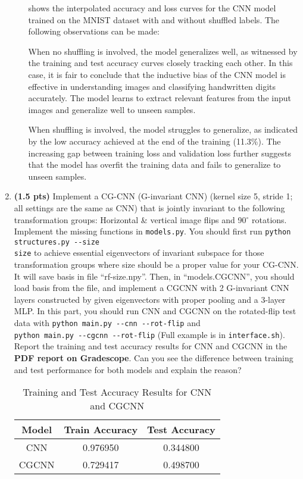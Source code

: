 \begin{enumerate}
\begin{enumerate}
 shows the interpolated accuracy and loss
curves for the CNN model trained on the MNIST dataset with and without shuffled
labels. The following observations can be made:

When no shuffling is involved, the model generalizes well, as witnessed by the
training and test accuracy curves closely tracking each other. In this case, it
is fair to conclude that the inductive bias of the CNN model is effective in
understanding images and classifying handwritten digits accurately. The model
learns to extract relevant features from the input images and generalize well to
unseen samples.

When shuffling is involved, the model struggles to generalize, as indicated by
the low accuracy achieved at the end of the training (11.3\%). The increasing
gap between training loss and validation loss further suggests that the model
has overfit the training data and fails to generalize to unseen samples. 


\end{enumerate}

\item {\bf (1.5 pts)}
 Implement a CG-CNN (G-invariant CNN) (kernel size 5, stride 1; all settings are the same as CNN) that is jointly invariant to the following transformation groups: Horizontal \& vertical image flips and 90$^\circ$ rotations. Implement the missing functions in \texttt{models.py}.
 You should first run \verb|python structures.py --size|\\
 \verb|size| to achieve essential
 eigenvectors of invariant subspace for those transformation groups where size should be a proper value for your CG-CNN.
 It will save basis in file ``rf-size.npy''.
 Then, in ``models.CGCNN'', you should load basis from the file, and implement
 a CGCNN with 2 G-invariant CNN layers constructed by given eigenvectors with proper pooling and a 3-layer MLP. In this part, you should run CNN and CGCNN on the rotated-flip test data with \verb|python main.py --cnn --rot-flip| and \\\verb|python main.py --cgcnn --rot-flip| (Full example is in \texttt{interface.sh}). Report the training and test accuracy results for CNN and CGCNN in the {\bf PDF report on Gradescope}. Can you see the difference between training and test performance for both models and explain the reason?

\begin{table}[ht]
\centering
\begin{tabular}{|c|c|c|}
\hline
\textbf{Model} & \textbf{Train Accuracy} & \textbf{Test Accuracy} \\
\hline
CNN & 0.976950 & 0.344800 \\
\hline
CGCNN & 0.729417 & 0.498700 \\
\hline
\end{tabular}
\caption{Training and Test Accuracy Results for CNN and CGCNN}
\label{table:accuracy_results}
\end{table}


\end{enumerate}
